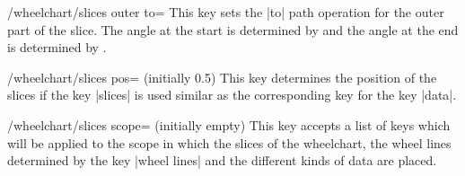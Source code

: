 \documentclass[a4paper,english,dvipsnames]{ltxdoc}
\begin{document}
\begin{key}{/wheelchart/slices outer to=}
This key sets the |to| path operation for the outer part of the slice. The angle at the start is determined by  and the angle at the end is determined by .
\begin{codeexample}[width=10cm]
\begin{tikzpicture}[looseness=3]
\wheelchart[
  data=,
  radius={0}{2.5},
  slices arc={0.4}{0},
  slices outer to={70}{70},
  start half,
  value=1,
  wheel data=\WCvarC,
  wheel data pos=1
]{\exampleforthismanual}
\end{tikzpicture}
\end{codeexample}
\end{key}
\begin{key}{/wheelchart/slices pos= (initially 0.5)}
This key determines the position of the slices if the key |slices| is used similar as the corresponding key for the key |data|.
\end{key}
\begin{stylekey}{/wheelchart/slices scope= (initially \normalfont empty)}
This key accepts a list of keys which will be applied to the scope in which the slices of the wheelchart, the wheel lines determined by the key |wheel lines| and the different kinds of data are placed.
\begin{codeexample}[width=10cm]
\begin{tikzpicture}
\wheelchart[
  data=,
  radius={3.9}{4.5},
  slices inner arc={0}{0},
  slices outer angle reduce=5*90/7,
  slices outer arc={0}{0},
  slices scope={
    shift={
      ($(90+\WCmidangle:0.559572)
      +(\WCmidangle:-1.16196)$)
    }
  },
  value=1,
  wheel data=\WCvarC,
  wheel data pos=0,
  wheel data style={
    rotate=\WCmidangle-90
  }
]{\exampleforthismanual}
\end{tikzpicture}
\end{codeexample}
\begin{codeexample}[width=10cm,preamble={\usepackage{siunitx}}]
\begin{tikzpicture}
\wheelchart[
  data=\WCvarC\\%
    \qty{\fpeval{\WCvarA/2}}{\percent},
  radius={0.5}{0.5+0.1*\WCvarA},
  slices inner arc tangent,
  slices outer angle reduce=
    180/\WCtotalcount,
  slices outer arc tangent,
  slices scope={shift={(\WCmidangle:
    {-cos(180/\WCtotalcount)/2})}},
  value=1
]{\exampleforthismanual}
\end{tikzpicture}
\end{codeexample}
\end{stylekey}
\end{document}
